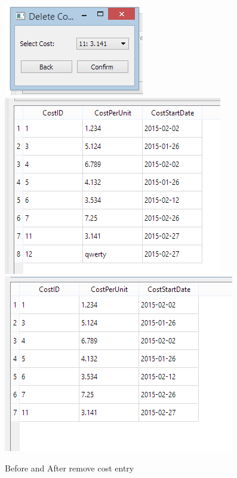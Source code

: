 \begin{figure}[H]
	\includegraphics{./testing/images/test_3_5_remove_cost_data.png}
	\includegraphics{./testing/images/test_3_5_remove_cost_before.png}
	\includegraphics{./testing/images/test_3_5_remove_cost_after.png}
	\caption{Before and After remove cost entry} \label{fig:test_3.5_result}
\end{figure}

